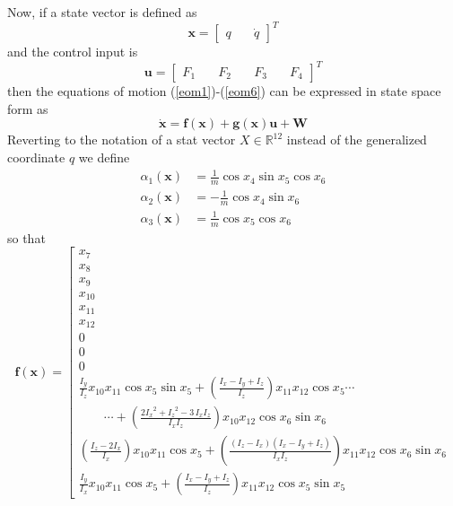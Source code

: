 \documentclass[twocolumn,10pt]{asme2e}
\begin{document}
{Now, if a state vector is defined as
\begin{equation}
	\textbf{x}= \left[\begin{array}{cc}
		q&\quad
		\dot{q}
	\end{array}\right]^T
\end{equation}
and the control input is 
\begin{equation}
	\textbf{u}= \left[\begin{array}{cccc}
		F_1&\quad
		F_2&\quad
		F_3&\quad
		F_4
	\end{array}\right]^T
\end{equation}
then the equations of motion (\ref{eom1})-(\ref{eom6}) can be expressed in state space form as
\begin{equation}
\dot{\textbf{x}}=\textbf{f}(\textbf{x})+\textbf{g}(\textbf{x})\textbf{u}+\textbf{W}\label{eqssM}
\end{equation}
Reverting to the notation of a stat vector $X\in\mathbb{R}^{12}$ instead of the generalized coordinate $q$ we define 
\begin{align}
	\alpha_1(\textbf{x})&=\tfrac{1}{m}\cos x_4 \sin x_5 \cos x_6\\
	\alpha_2(\textbf{x})&=-\tfrac{1}{m}\cos x_4\sin x_6\\
	\alpha_3(\textbf{x})&=\tfrac{1}{m}\cos x_{5}\cos x_{6}
\end{align}
so that
\begin{equation}
	\textbf{f}(\textbf{x})=\left[\begin{array}{c}
		x_7\\
	x_8\\
		x_9\\
		x_{10}\\
		x_{11}\\
	x_{12}\\
	0\\
	0\\
	0\\ \frac{I_y}{I_z}x_{10}x_{11}\cos{x}_{5}\sin{x}_{5}+\left(\frac{I_{x}-I_y+I_z}{I_z}\right)x_{11}x_{12}\cos{x}_{5}\cdots\\\qquad\cdots+\left(\frac{2{I_{x}}^2+{I_{z}}^2-3\,I_{x}I_{z}}{I_xI_z}\right)x_{10}x_{12}\cos{x}_{6}\sin{x}_{6}\\
	\left(\frac{I_z-2I_x}{I_x}\right)x_{10}x_{11}\cos{x}_{5}+\left(\frac{(I_z-I_x)(I_x-I_y+I_z)}{I_xI_z}\right)x_{11}x_{12}\cos{x}_{6}\sin{x}_{6}\\
	\frac{I_y}{I_x}x_{10}x_{11}\cos{x}_{5}+\left(\frac{I_{x}-I_y+I_z}{I_z}\right)x_{11}x_{12}\cos{x}_{5}\sin{x}_{5}

\end{array}
\end{equation}}
\end{document}
